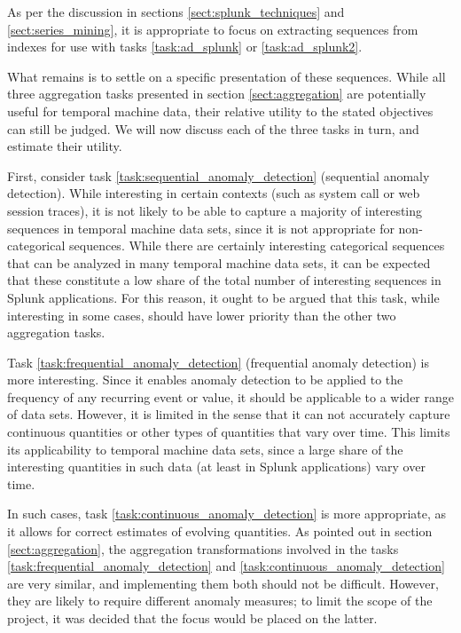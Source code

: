As per the discussion in sections \ref{sect:splunk_techniques} and \ref{sect:series_mining}, it is appropriate to focus on extracting sequences from indexes for use with tasks \ref{task:ad_splunk} or \ref{task:ad_splunk2}.

What remains is to settle on a specific presentation of these sequences. While all three aggregation tasks presented in section \ref{sect:aggregation} are potentially useful for temporal machine data, their relative utility to the stated objectives can still be judged. We will now discuss each of the three tasks in turn, and estimate their utility.

First, consider task \ref{task:sequential_anomaly_detection} (sequential anomaly detection). While interesting in certain contexts (such as system call or web session traces), it is not likely to be able to capture a majority of interesting sequences in temporal machine data sets, since it is not appropriate for non-categorical sequences. While there are certainly interesting categorical sequences that can be analyzed in many temporal machine data sets, it can be expected that these constitute a low share of the total number of interesting sequences in Splunk applications. For this reason, it ought to be argued that this task, while interesting in some cases, should have lower priority than the other two aggregation tasks.

Task \ref{task:frequential_anomaly_detection} (frequential anomaly detection) is more interesting. Since it enables anomaly detection to be applied to the frequency of any recurring event or value, it should be applicable to a wider range of data sets. However, it is limited in the sense that it can not accurately capture continuous quantities or other types of quantities that vary over time. This limits its applicability to temporal machine data sets, since a large share of the interesting quantities in such data (at least in Splunk applications) vary over time.

In such cases, task \ref{task:continuous_anomaly_detection} is more appropriate, as it allows for correct estimates of evolving quantities. As pointed out in section \ref{sect:aggregation}, the aggregation transformations involved in the tasks \ref{task:frequential_anomaly_detection} and \ref{task:continuous_anomaly_detection} are very similar, and implementing them both should not be difficult. However, they are likely to require different anomaly measures; to limit the scope of the project, it was decided that the focus would be placed on the latter.

